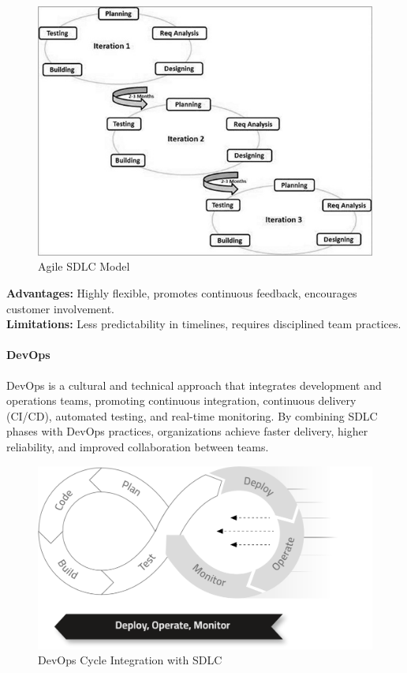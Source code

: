 \begin{spacing}{1.2}
\begin{figure}[H]
    \centering
    \includegraphics[scale=0.65]{Images/sdlc_agile_model.jpg}
    \caption{Agile SDLC Model}
    \label{fig:agile_model}
\end{figure}

\textbf{Advantages:} Highly flexible, promotes continuous feedback, encourages customer involvement.\\ 
\textbf{Limitations:} Less predictability in timelines, requires disciplined team practices.  


\paragraph{DevOps}
DevOps is a cultural and technical approach that integrates development and operations teams, promoting continuous integration, continuous delivery (CI/CD), automated testing, and real-time monitoring. By combining SDLC phases with DevOps practices, organizations achieve faster delivery, higher reliability, and improved collaboration between teams.

\begin{figure}[H]
    \centering
    \includegraphics[scale=0.3]{Images/devops.png}
    \caption{DevOps Cycle Integration with SDLC}
    \label{fig:devops_cycle}
\end{figure}


\end{spacing}
